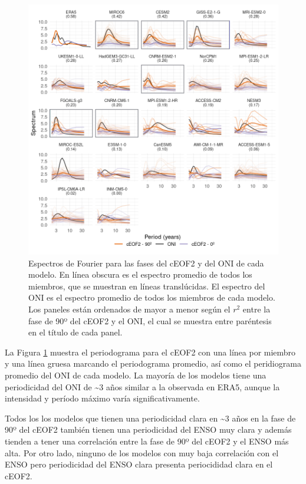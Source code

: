 \documentclass[12pt,oneside,a4paper]{reedthesis}
\begin{document}
\begin{figure}

{\centering \includegraphics{figures/50-cmip6/fft-ceof2-1} 

}

\caption{Espectros de Fourier para las fases del cEOF2 y del ONI de cada modelo. En línea obscura es el espectro promedio de todos los miembros, que se muestran en líneas translúcidas. El espectro del ONI es el espectro promedio de todos los miembros de cada modelo. Los paneles están ordenados de mayor a menor según el \(r^2\) entre la fase de 90º del cEOF2 y el ONI, el cual se muestra entre paréntesis en el título de cada panel.}\label{fig:fft-ceof2}
\end{figure}





La Figura \ref{fig:fft-ceof2} muestra el periodograma para el cEOF2 con una línea por miembro y una línea gruesa marcando el periodograma promedio, así como el peridiograma promedio del ONI de cada modelo.
La mayoría de los modelos tiene una periodicidad del ONI de \textasciitilde3 años similar a la observada en ERA5, aunque la intensidad y período máximo varía significativamente.

Todos los los modelos que tienen una periodicidad clara en \textasciitilde3 años en la fase de 90º del cEOF2 también tienen una periodicidad del ENSO muy clara y además tienden a tener una correlación entre la fase de 90º del cEOF2 y el ENSO más alta.
Por otro lado, ninguno de los modelos con muy baja correlación con el ENSO pero periodicidad del ENSO clara presenta periocididad clara en el cEOF2.
\end{document}
